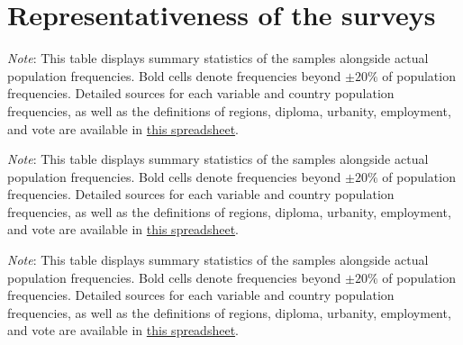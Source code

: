 

\clearpage
\section{Representativeness of the surveys}\label{app:representativeness}

\begin{table}[h!]
    \caption[Sample representativeness in FR, DE, IT]{Sample representativeness in France, Germany, Italy. %
    } \label{tab:representativeness_1}
    \makebox[\textwidth][c]{
        \resizebox*{!}{.60\textheight}{%
        
        }
    }
    {\footnotesize \textit{Note}: This table displays summary statistics of the samples alongside actual population frequencies. Bold cells denote frequencies beyond $\pm 20\%$ of population frequencies. 
    Detailed sources for each variable and country population frequencies, as well as the definitions of regions, diploma, urbanity, employment, and vote are available in \href{https://github.com/bixiou/robustness_global_redistr/raw/main/questionnaire/sources.xlsx}{this spreadsheet}. 
    } 
\end{table}

\begin{table}[h!]
    \caption[Sample representativeness in PL, ES, GB, CH]{Sample representativeness in Poland, Spain, the UK, Switzerland. %
    } \label{tab:representativeness_2}
    \makebox[\textwidth][c]{\resizebox*{!}{.60\textheight}{}}
    {\footnotesize \textit{Note}: This table displays summary statistics of the samples alongside actual population frequencies. Bold cells denote frequencies beyond $\pm 20\%$ of population frequencies. 
    Detailed sources for each variable and country population frequencies, as well as the definitions of regions, diploma, urbanity, employment, and vote are available in \href{https://github.com/bixiou/robustness_global_redistr/raw/main/questionnaire/sources.xlsx}{this spreadsheet}. 
    } 
\end{table}

\begin{table}[h!]
    \caption[Sample representativeness in JP, SA, US]{Sample representativeness in Japan, Saudi Arabia, the United States. %
    } \label{tab:representativeness_3}
    \makebox[\textwidth][c]{\resizebox*{!}{.80\textheight}{}}
    {\footnotesize \textit{Note}: This table displays summary statistics of the samples alongside actual population frequencies. Bold cells denote frequencies beyond $\pm 20\%$ of population frequencies. 
    Detailed sources for each variable and country population frequencies, as well as the definitions of regions, diploma, urbanity, employment, and vote are available in \href{https://github.com/bixiou/robustness_global_redistr/raw/main/questionnaire/sources.xlsx}{this spreadsheet}. 
    } 
\end{table}
\clearpage
